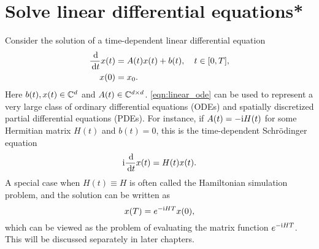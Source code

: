% 
% 
% 
% 
% 
% 


\section{Solve linear differential equations*}\label{sec:linear_ode}

Consider the solution of a time-dependent linear differential equation
\begin{equation}
\begin{split}
\frac{\,\mathrm{d}}{\,\mathrm{d} t}x(t) &= A(t) x(t)+b(t), \quad t\in [0,T],\\
x(0)&=x_0.
\end{split}
\label{eqn:linear_ode}
\end{equation}
Here $b(t),x(t)\in \mathbb{C}^d$ and $A(t)\in \mathbb{C}^{d\times d}$. 
\cref{eqn:linear_ode} can be used to represent a very large class of ordinary differential equations (ODEs) and spatially discretized partial differential equations (PDEs).
For instance, if $A(t)=-\mathrm{i} H(t)$ for some Hermitian matrix $H(t)$ and $b(t)=0$, this is the time-dependent Schr\"odinger equation
\begin{equation}
\mathrm{i} \frac{\,\mathrm{d}}{\,\mathrm{d} t}x(t) = H(t) x(t).
\label{eqn:td_schrodinger}
\end{equation}
A special case when $H(t)\equiv H$ is often called the Hamiltonian simulation problem, and the solution can be written as
\begin{equation}
x(T)=e^{-\mathrm{i} HT}x(0),
\end{equation}
which can be viewed as the problem of evaluating the matrix function $e^{-\mathrm{i} HT}$. This  will be discussed separately in later chapters.
  
